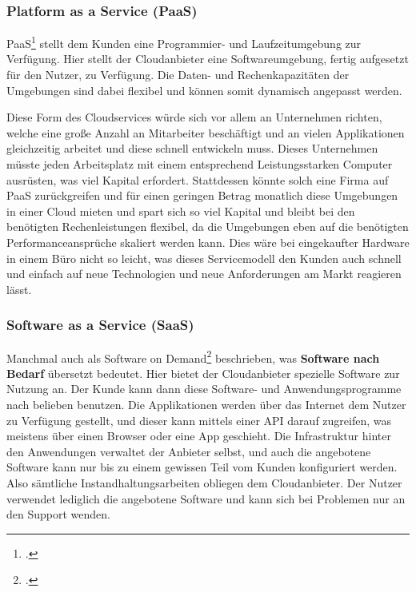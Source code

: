\subsubsection{Platform as a Service (PaaS)}
PaaS\footcite{cloud-ms} stellt dem Kunden eine Programmier- und Laufzeitumgebung zur Verfügung. Hier stellt der Cloudanbieter eine Softwareumgebung, fertig
aufgesetzt für den Nutzer, zu Verfügung. Die Daten- und Rechenkapazitäten
der Umgebungen sind dabei flexibel und können somit dynamisch angepasst werden.

Diese Form des Cloudservices würde sich vor allem an Unternehmen richten, welche eine große Anzahl an Mitarbeiter beschäftigt und an vielen Applikationen gleichzeitig arbeitet und diese schnell entwickeln muss. 
Dieses Unternehmen müsste jeden Arbeitsplatz mit einem entsprechend Leistungsstarken Computer ausrüsten, was viel Kapital erfordert. Stattdessen könnte solch eine Firma auf PaaS zurückgreifen und für einen geringen Betrag monatlich diese Umgebungen in einer Cloud mieten und spart sich so viel Kapital und bleibt bei den benötigten
Rechenleistungen flexibel, da die Umgebungen eben auf die benötigten Performanceansprüche skaliert werden kann. Dies wäre bei eingekaufter Hardware in einem Büro nicht so leicht, was dieses Servicemodell den Kunden auch schnell und einfach auf neue Technologien und neue Anforderungen am Markt reagieren lässt.


\subsubsection{Software as a Service (SaaS)}
Manchmal auch als Software on Demand\footcite{cloud-computing} beschrieben, was \textbf{Software nach Bedarf} übersetzt bedeutet. Hier bietet der Cloudanbieter spezielle Software zur Nutzung an. Der Kunde kann dann diese Software- und Anwendungsprogramme nach belieben benutzen. Die Applikationen werden über das Internet dem Nutzer zu Verfügung gestellt, 
und dieser kann mittels einer API darauf zugreifen, was meistens über einen Browser oder eine App geschieht. Die Infrastruktur hinter den Anwendungen verwaltet der Anbieter selbst, und auch die angebotene Software kann nur bis zu einem gewissen Teil vom Kunden konfiguriert werden. Also sämtliche Instandhaltungsarbeiten obliegen dem Cloudanbieter.
Der Nutzer verwendet lediglich die angebotene Software und kann sich bei Problemen nur an den Support wenden.

